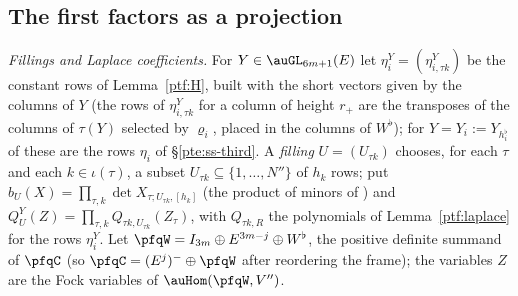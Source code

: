 \documentclass[10pt]{amsart}
\theoremstyle{definition}
\theoremstyle{remark}
\begin{document}
\subsection{The first factors as a projection}\label{pfq:ss-proj}

\emph{Fillings and Laplace coefficients.} For $Y\in\auGL_{6m+1}(E)$ let $\eta^Y_i=(\eta^Y_{i,\tau k})$ be the
constant rows of Lemma~\ref{ptf:H}, built with the short vectors given by the columns of $Y$ (the rows
of $\eta^Y_{i,\tau k}$ for a column of height $r_+$ are the transposes of the columns of $\tau(Y)$ selected by
$\varrho_i$, placed in the columns of $W^\flat$); for $Y=Y_i:=Y_{h^\flat_i}$ of {\cite[Lemma~14.21]{P46}}
these are the rows $\eta_i$ of \S\ref{pte:ss-third}. A \emph{filling} $U=(U_{\tau k})$ chooses, for each $\tau$
and each $k\in\iota(\tau)$, a subset $U_{\tau k}\subseteq\{1,\dots,N''\}$ of $h_k$ rows; put
$b_U(X)=\prod_{\tau,k}\det X_{\tau;U_{\tau k},[h_k]}$ (the product of minors of {\cite[\S5.2.6]{P49}}) and
$Q^Y_U(Z)=\prod_{\tau,k}Q_{\tau k,U_{\tau k}}(Z_\tau)$, with $Q_{\tau k,R}$ the polynomials of
Lemma~\ref{ptf:laplace} for the rows $\eta^Y_i$. Let $\pfqW=I_{3m}\oplus E^{3m-j}\oplus W^\flat$, the
positive definite summand of $\pfqC$ (so $\pfqC=(E^j)^-\oplus\pfqW$ after reordering the frame); the
variables $Z$ are the Fock variables of $\auHom(\pfqW,V'')$.
\end{document}
